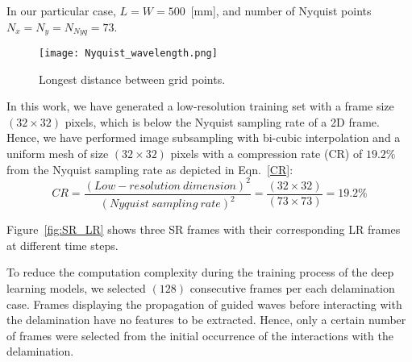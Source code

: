 In our particular case, $L=W=500$~[mm], and number of Nyquist points $N_x= N_y= N_{Nyq} =73$.

\begin{figure} [!h]
	\centering
	\texttt{[image: Nyquist\_wavelength.png]}
	\caption{Longest distance between grid points.}
	\label{fig:Nyquist}
\end{figure}


In this work, we have generated a low-resolution training set with a frame size \((32\times32)\) pixels, which is below the Nyquist sampling rate of a 2D frame.
Hence, we have performed image subsampling with bi-cubic interpolation and a uniform mesh of size \((32\times32)\) pixels with a compression rate (CR) of \(19.2\%\) from the Nyquist sampling rate as depicted in Eqn.~\ref{CR}:
\begin{equation}
	CR = \frac{(Low-resolution\ dimension)^2}{(Nyquist\ sampling\ rate)^2} = \frac{(32\times32)}{(73\times73)}=19.2\%
	\label{CR}
\end{equation}

Figure~\ref{fig:SR_LR} shows three SR frames with their corresponding LR frames at different time steps.

To reduce the computation complexity during the training process of the deep learning models, we selected \((128)\) consecutive frames per each delamination case.
Frames displaying the propagation of guided waves before interacting with the delamination have no features to be extracted. 
Hence, only a certain number of frames were selected from the initial occurrence of the interactions with the delamination.

